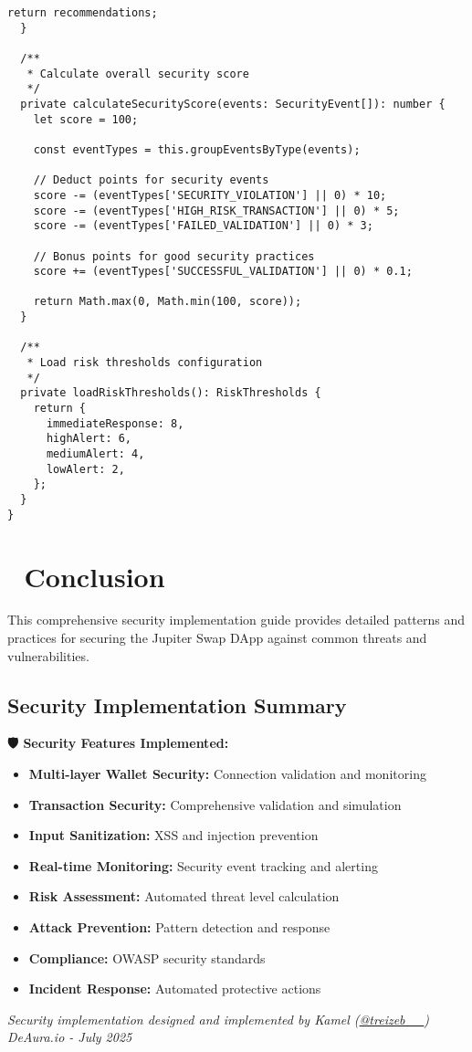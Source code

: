 \documentclass[11pt,a4paper]{article}
\begin{document}
\begin{lstlisting}[style=typescript, caption=Security Monitoring System]
    return recommendations;
  }

  /**
   * Calculate overall security score
   */
  private calculateSecurityScore(events: SecurityEvent[]): number {
    let score = 100;

    const eventTypes = this.groupEventsByType(events);

    // Deduct points for security events
    score -= (eventTypes['SECURITY_VIOLATION'] || 0) * 10;
    score -= (eventTypes['HIGH_RISK_TRANSACTION'] || 0) * 5;
    score -= (eventTypes['FAILED_VALIDATION'] || 0) * 3;

    // Bonus points for good security practices
    score += (eventTypes['SUCCESSFUL_VALIDATION'] || 0) * 0.1;

    return Math.max(0, Math.min(100, score));
  }

  /**
   * Load risk thresholds configuration
   */
  private loadRiskThresholds(): RiskThresholds {
    return {
      immediateResponse: 8,
      highAlert: 6,
      mediumAlert: 4,
      lowAlert: 2,
    };
  }
}
\end{lstlisting}

\section{🎯 Conclusion}

This comprehensive security implementation guide provides detailed patterns and practices for securing the Jupiter Swap DApp against common threats and vulnerabilities.

\subsection{Security Implementation Summary}

\begin{tcolorbox}[colback=successGreen!10,colframe=successGreen]
\textbf{🛡️ Security Features Implemented:}
\begin{itemize}
    \item \textbf{Multi-layer Wallet Security:} Connection validation and monitoring
    \item \textbf{Transaction Security:} Comprehensive validation and simulation
    \item \textbf{Input Sanitization:} XSS and injection prevention
    \item \textbf{Real-time Monitoring:} Security event tracking and alerting
    \item \textbf{Risk Assessment:} Automated threat level calculation
    \item \textbf{Attack Prevention:} Pattern detection and response
    \item \textbf{Compliance:} OWASP security standards
    \item \textbf{Incident Response:} Automated protective actions
\end{itemize}
\end{tcolorbox}

\vspace{1cm}

\begin{center}
\textit{Security implementation designed and implemented by Kamel (\href{https://x.com/treizeb__}{@treizeb\_\_})\\
DeAura.io - July 2025}
\end{center}
\end{document}
